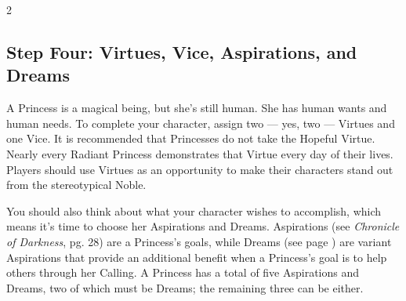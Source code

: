 \begin{multicols}{2}


\subsection*{Step Four: Virtues, Vice, Aspirations, and Dreams}   

A Princess is a magical being, but she's still human. She has human wants and human needs. To complete your character, assign two — yes, two — Virtues and one Vice. It is recommended that Princesses do not take the Hopeful Virtue. Nearly every Radiant Princess demonstrates that Virtue every day of their lives. Players should use Virtues as an opportunity to make their characters stand out from the stereotypical Noble.

You should also think about what your character wishes to accomplish, which means it's time to choose her Aspirations and Dreams. Aspirations (see \textit{Chronicle of Darkness}, pg. 28) are a Princess's goals, while Dreams (see page \pageref{subsec:Dreams}) are variant Aspirations that provide an additional benefit when a Princess's goal is to help others through her Calling. A Princess has a total of five Aspirations and Dreams, two of which must be Dreams; the remaining three can be either. 


\end{multicols}
